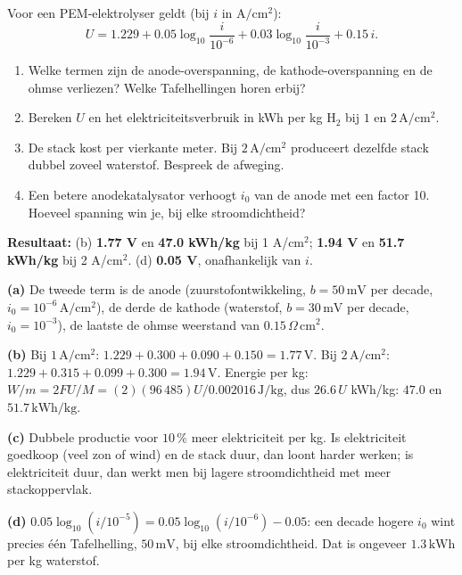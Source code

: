 \begin{oefening}
Voor een PEM-elektrolyser geldt (bij \(i\) in \(\mathrm{A/cm^2}\)):
\[
U = 1.229 + 0.05\log_{10}\frac{i}{10^{-6}} + 0.03\log_{10}\frac{i}{10^{-3}} + 0.15\,i.
\]

\begin{enumerate}
\item[(a)]
  Welke termen zijn de anode-overspanning, de kathode-overspanning en de ohmse verliezen? Welke Tafelhellingen horen erbij?
\item[(b)]
  Bereken \(U\) en het elektriciteitsverbruik in kWh per kg \(\mathrm{H_2}\) bij \(1\) en \(2\,\mathrm{A/cm^2}\).
\item[(c)]
  De stack kost per vierkante meter. Bij \(2\,\mathrm{A/cm^2}\) produceert dezelfde stack dubbel zoveel waterstof. Bespreek de afweging.
\item[(d)]
  Een betere anodekatalysator verhoogt \(i_0\) van de anode met een factor 10. Hoeveel spanning win je, bij elke stroomdichtheid?
\end{enumerate}
\end{oefening}
\begin{oplossing}
\textbf{Resultaat:} (b) \textbf{1.77 V} en \textbf{47.0 kWh/kg} bij 1 A/cm\(^2\); \textbf{1.94 V} en \textbf{51.7 kWh/kg} bij 2 A/cm\(^2\). (d) \textbf{0.05 V}, onafhankelijk van \(i\).

\textbf{(a)} De tweede term is de anode (zuurstofontwikkeling, \(b = 50\,\mathrm{mV}\) per decade, \(i_0 = 10^{-6}\,\mathrm{A/cm^2}\)), de derde de kathode (waterstof, \(b = 30\,\mathrm{mV}\) per decade, \(i_0 = 10^{-3}\)), de laatste de ohmse weerstand van \(0.15\,\Omega\,\mathrm{cm^2}\).

\textbf{(b)} Bij \(1\,\mathrm{A/cm^2}\): \(1.229 + 0.300 + 0.090 + 0.150 = 1.77\,\mathrm{V}\). Bij \(2\,\mathrm{A/cm^2}\): \(1.229 + 0.315 + 0.099 + 0.300 = 1.94\,\mathrm{V}\). Energie per kg: \(W/m = 2FU/M = (2)(96\,485)U/0.002016\,\mathrm{J/kg}\), dus \(26.6\,U\) kWh/kg: \(47.0\) en \(51.7\,\mathrm{kWh/kg}\).

\textbf{(c)} Dubbele productie voor \(10\,\%\) meer elektriciteit per kg. Is elektriciteit goedkoop (veel zon of wind) en de stack duur, dan loont harder werken; is elektriciteit duur, dan werkt men bij lagere stroomdichtheid met meer stackoppervlak.

\textbf{(d)} \(0.05\log_{10}(i/10^{-5}) = 0.05\log_{10}(i/10^{-6}) - 0.05\): een decade hogere \(i_0\) wint precies \'e\'en Tafelhelling, \(50\,\mathrm{mV}\), bij elke stroomdichtheid. Dat is ongeveer \(1.3\,\mathrm{kWh}\) per kg waterstof.
\end{oplossing}
